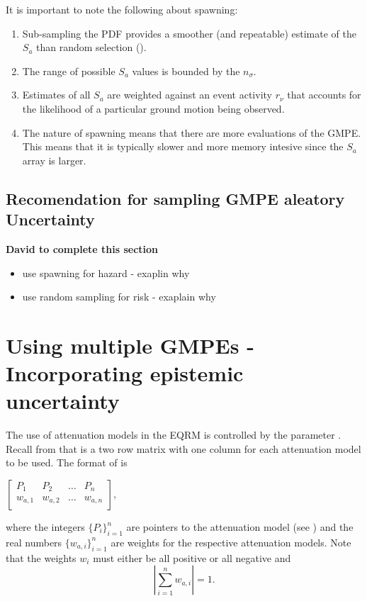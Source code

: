It is important to note the following about spawning:
\begin{enumerate}
\item Sub-sampling the PDF provides a smoother (and repeatable)
estimate of the $S_a$ than random selection
(). \item The range of possible $S_a$
values is bounded by the $n_\sigma$. \item Estimates of all $S_a$
are weighted against an event activity $r_\nu$ that accounts for the
likelihood of a particular ground motion being observed. \item The
nature of spawning means that there are more evaluations of the
GMPE. This means that it is typically slower and more memory
intesive since the $S_a$ array is larger.
\end{enumerate}




\subsection{Recomendation for sampling GMPE aleatory Uncertainty}

\textbf{David to complete this section}
\begin{itemize}
\item use spawning for hazard - exaplin why
\item use random sampling for risk - exaplain why
\end{itemize}

\section{Using multiple GMPEs - Incorporating epistemic uncertainty}
\label{sec:attn-multi-attnmodels}

The use of attenuation models in the EQRM is controlled by the
 parameter .
Recall from  that
 is a two row matrix with one
column for each attenuation model to be used. The format of
 is
\begin{center}
\begin{math}
 \left[ \begin{array}{ccccc}
P_1 & P_2 &  \hdots & P_n \\
w_{a,1} & w_{a,2} &  \hdots & w_{a,n} \\
\end{array} \right],
\end{math}
\end{center}
where the integers $\{P_i\}_{i=1}^n$ are pointers to the
attenuation model (see ) and the real numbers
$\{w_{a,i}\}_{i=1}^n$ are weights for the respective attenuation
models. Note that the weights $w_i$ must either be all positive or
all negative and
\begin{equation}
\left|\sum_{i=1}^{n}w_{a,i}\right| = 1.
\end{equation}



